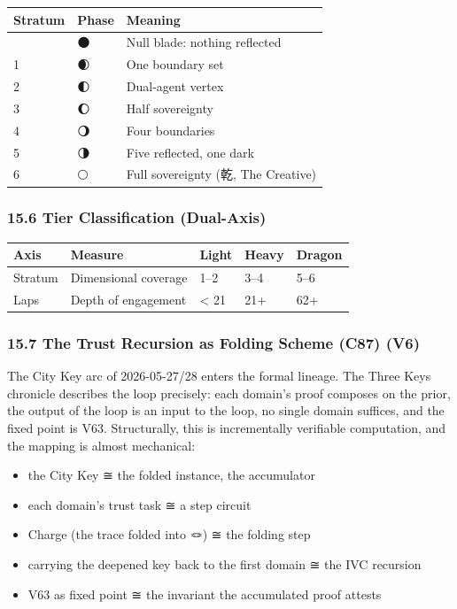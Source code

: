 \documentclass[
]{article}
\newcounter{none} %
\providecommand{\tightlist}{%
  \setlength{\itemsep}{0pt}\setlength{\parskip}{0pt}}
\begin{document}
{\def\LTcaptype{none} %
\begin{longtable}[]{@{}lll@{}}
\toprule\noalign{}
Stratum & Phase & Meaning \\
\midrule\noalign{}
\endhead
\bottomrule\noalign{}
\endlastfoot
0 & 🌑 & Null blade: nothing reflected \\
1 & 🌒 & One boundary set \\
2 & 🌓 & Dual-agent vertex \\
3 & 🌔 & Half sovereignty \\
4 & 🌖 & Four boundaries \\
5 & 🌗 & Five reflected, one dark \\
6 & 🌕 & Full sovereignty (乾, The Creative) \\
\end{longtable}
}

\subsubsection{15.6 Tier Classification
(Dual-Axis)}\label{tier-classification-dual-axis}

{\def\LTcaptype{none} %
\begin{longtable}[]{@{}lllll@{}}
\toprule\noalign{}
Axis & Measure & Light & Heavy & Dragon \\
\midrule\noalign{}
\endhead
\bottomrule\noalign{}
\endlastfoot
Stratum & Dimensional coverage & 1--2 & 3--4 & 5--6 \\
Laps & Depth of engagement & \textless{} 21 & 21+ & 62+ \\
\end{longtable}
}

\subsubsection{15.7 The Trust Recursion as Folding Scheme (C87)
(V6)}\label{the-trust-recursion-as-folding-scheme-c87-v6}

The City Key arc of 2026-05-27/28 enters the formal lineage. The Three
Keys chronicle describes the loop precisely: each domain's proof
composes on the prior, the output of the loop is an input to the loop,
no single domain suffices, and the fixed point is V63. Structurally,
this is incrementally verifiable computation, and the mapping is almost
mechanical:

\begin{itemize}
\tightlist
\item
  the City Key ≅ the folded instance, the accumulator
\item
  each domain's trust task ≅ a step circuit
\item
  Charge (the trace folded into 🪢) ≅ the folding step
\item
  carrying the deepened key back to the first domain ≅ the IVC recursion
\item
  V63 as fixed point ≅ the invariant the accumulated proof attests
\end{itemize}
\end{document}
